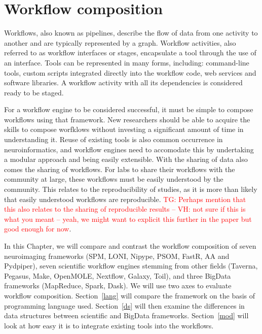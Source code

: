 \documentclass{report}
\newcommand{\tristan}[1]{\textcolor{red}{TG: #1}}
\begin{document}
    \chapter{Workflow composition}\label{workcomp}

        Workflows, also known as pipelines, describe the flow of data from one 
        activity to another and are typically represented by a graph. Workflow activities, also referred to as 
        workflow interfaces or stages, encapsulate a tool through the 
        use of an interface. Tools can be represented in many forms, 
        including: command-line tools, custom scripts integrated 
        directly into the workflow code, web services and software 
        libraries. A workflow activity with all its 
        dependencies is considered ready to be staged.

        For a workflow engine to be considered successful, it must be simple to 
        compose workflows using that framework. New researchers should be able 
        to acquire the skills to compose worfklows without
        investing a significant amount of time in understanding it. Reuse of
        existing tools is also common occurrence in neuroinformatics, and 
        workflow engines need to accomodate this by undertaking a modular 
        approach and being easily extensible. With the sharing of data also 
        comes the sharing of workflows. For labs to share their workflows with
        the community at large, these workflows must be easily understood by the
        community. This relates to the reproducibility of studies, as it is 
        more than likely that easily understood workflows are reproducible. 
        \tristan{Perhaps mention that this also relates to the sharing
        of reproducible results -- VH: not sure if this is what you meant --
        yeah, we might want to explicit this further in the paper but
        good enough for now}.

        In this Chapter, we will compare and contrast the workflow composition 
        of seven neuroimaging frameworks (SPM, LONI, Nipype, PSOM, FastR, AA and
        Pydpiper), seven scientific workflow engines stemming from other fields
        (Taverna, Pegasus, Make, OpenMOLE, Nextflow, Galaxy, Toil), and three
        BigData frameworks (MapReduce, Spark, Dask). We will use two axes to
        evaluate workflow composition. Section~\ref{lang} will compare the 
        framework on the basis of programming language used. Section~\ref{ds}
        will then examine the differences in data structures between scientific
        and BigData frameworks. 
        Section~\ref{mod} will look at how easy it is to integrate existing 
        tools into the workflows.
\end{document}
